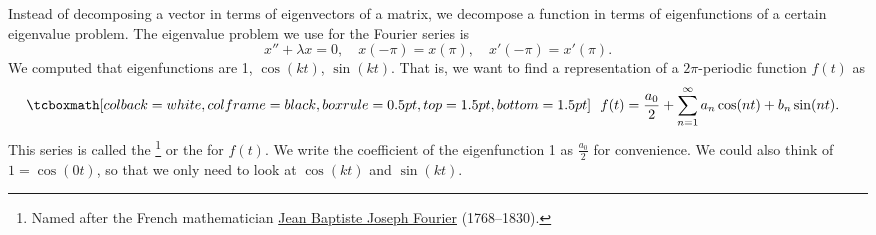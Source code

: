 Instead of decomposing a vector in terms of eigenvectors of a matrix,
we decompose a function in terms of eigenfunctions of a certain
eigenvalue problem.  The eigenvalue problem we use for
the Fourier series is 
\begin{equation*}
x'' + \lambda x = 0, \quad x(-\pi) = x(\pi), \quad x'(-\pi) = x'(\pi) .
\end{equation*}
We computed that eigenfunctions are 1, $\cos (k t)$,
$\sin (k t)$.  That is, we want to find a representation of a
$2\pi$-periodic function $f(t)$ as
\begin{equation*}
\mybxbg{~~
f(t) = \frac{a_0}{2} +
\sum_{n=1}^\infty a_n \cos (n t) + b_n \sin (n t) .
~~}
\end{equation*}
This series is called the \emph{}%
\footnote{Named after the French mathematician
\href{https://en.wikipedia.org/wiki/Joseph_Fourier}{Jean Baptiste Joseph Fourier}
(1768--1830).} or the
\emph{} for $f(t)$.
We write the coefficient of the eigenfunction 1 as $\frac{a_0}{2}$
for convenience.
We could also think of $1 = \cos (0t)$, so that
we only need to look at $\cos (kt)$ and $\sin (kt)$.

